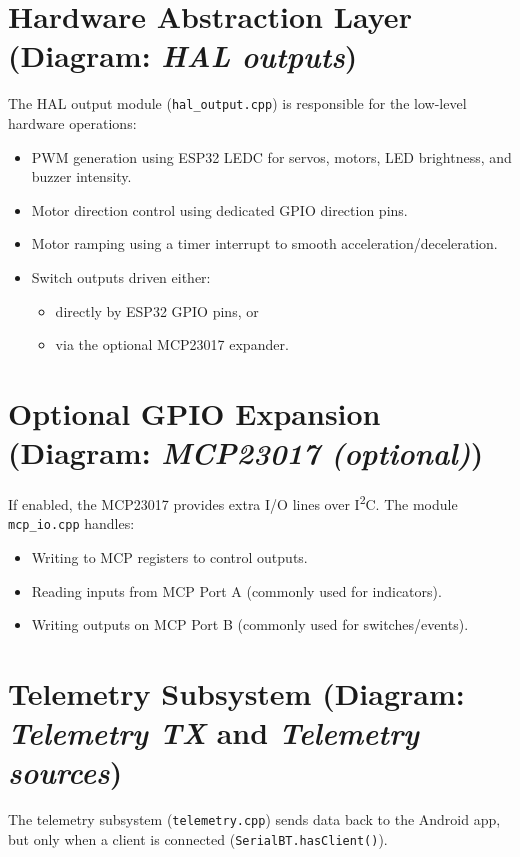 \section{Hardware Abstraction Layer (Diagram: \textit{HAL outputs})}

The HAL output module (\texttt{hal\_output.cpp}) is responsible for the low-level hardware operations:

\begin{itemize}
    \item PWM generation using ESP32 LEDC for servos, motors, LED brightness, and buzzer intensity.
    \item Motor direction control using dedicated GPIO direction pins.
    \item Motor ramping using a timer interrupt to smooth acceleration/deceleration.
    \item Switch outputs driven either:
    \begin{itemize}
        \item directly by ESP32 GPIO pins, or
        \item via the optional MCP23017 expander.
    \end{itemize}
\end{itemize}

\section{Optional GPIO Expansion (Diagram: \textit{MCP23017 (optional)})}

If enabled, the MCP23017 provides extra I/O lines over I\textsuperscript{2}C.
The module \texttt{mcp\_io.cpp} handles:

\begin{itemize}
    \item Writing to MCP registers to control outputs.
    \item Reading inputs from MCP Port A (commonly used for indicators).
    \item Writing outputs on MCP Port B (commonly used for switches/events).
\end{itemize}

\section{Telemetry Subsystem (Diagram: \textit{Telemetry TX} and \textit{Telemetry sources})}

The telemetry subsystem (\texttt{telemetry.cpp}) sends data back to the Android app, but only when a client is connected
(\texttt{SerialBT.hasClient()}).

